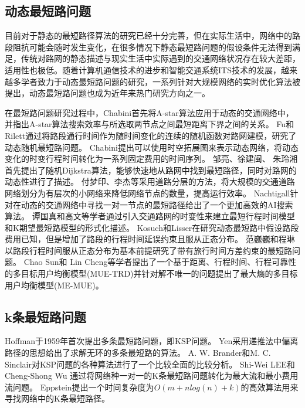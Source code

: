 \subsection{动态最短路问题}\label{subsec:动态最短路问题}

目前对于静态的最短路径算法的研究已经十分完善，但在实际生活中，网络中的路段阻抗可能会随时发生变化，在很多情况下静态最短路问题的假设条件无法得到满足，传统对路网的静态描述与现实生活中实际遇到的交通网络状况存在较大差距，适用性也极低。随着计算机通信技术的进步和智能交通系统ITS技术的发展，越来越多学者致力于动态最短路问题的研究，一系列针对大规模网络的实时优化算法被提出，动态最短路问题也成为近年来热门研究方向之一。

在最短路问题研究过程中，Chabini首先将A-star算法应用于动态的交通网络中，并指出A-star算法搜索效率与所选取两节点之间最短距离下界之间的关系\cite*{chabini1998discrete}。
Fu和Rilett通过将路段通行时间作为随时间变化的连续的随机函数对路网建模，研究了动态随机最短路问题\cite*{fu1998expected}。
Chabini提出可以使用时空拓展图来表示动态网络，将动态变化的时变行程时间转化为一系列固定费用的时间序列\cite*{chabini1997new}。
邹亮、徐建闽、 朱玲湘首先提出了随机Dijkstra算法，能够快速地从路网中找到最短路径，同时对路网的动态性进行了描述\cite*{邹亮2007算法改进及其在动态最短路径问题中的应用}。
付梦印、李杰等采用道路分层的方法，将大规模的交通道路网络划分为有层次的小网络来降低网络节点的数量，提高运行效率\cite*{付梦印2005基于分层道路网络的新型路径规划算法}。
Nachtigall针对在动态的交通网络中寻找一对一节点的最短路径给出了一个更加高效的AI搜索算法\cite*{nachtigall1995time}。
谭国真和高文等学者通过引入交通路网的时变性来建立最短行程时间模型和K期望最短路模型的形式化描述\cite*{谭国真2003随机时间依赖网络的}。
Kosuch和Lisser在研究动态最短路中假设路段费用已知，但是增加了路段的行程时间延误约束且服从正态分布\cite*{kosuch2010stochastic}。
范巍巍和程琳以路段行程时间服从正态分布为基本前提研究了带有旅行时间方差约束的最短路问题\cite*{范巍巍2007随机路网的最短路径问题研究}。
Chao Sun和 Lin Cheng等学者提出了一个基于距离、行程时间、行程可靠性的多目标用户均衡模型(MUE-TRD)并针对解不唯一的问题提出了最大熵的多目标用户均衡模型(ME-MUE)\cite*{sun2019multi}。

\subsection{k条最短路问题}\label{subsec:k条最短路问题}

Hoffman于1959年首次提出多条最短路问题，即KSP问题\cite*{hoffman1959method}。
Yen采用递推法中偏离路径的思想给出了求解无环的多条最短路的算法\cite*{yen1971finding}。
A. W. Brander和M. C. Sinclair对KSP问题的各种算法进行了一个比较全面的比较分析\cite*{brander1996comparative}。
Shi-Wei LEE和Cheng-Shong Wu 通过将网络种一对一的K条最短路问题转化为最大流和最小费用流问题\cite*{lee1999k}。
Eppstein提出一个时间复杂度为$O(m+nlog(n)+k)$的高效算法用来寻找网络中的K条最短路径\cite*{eppstein1998finding}。


